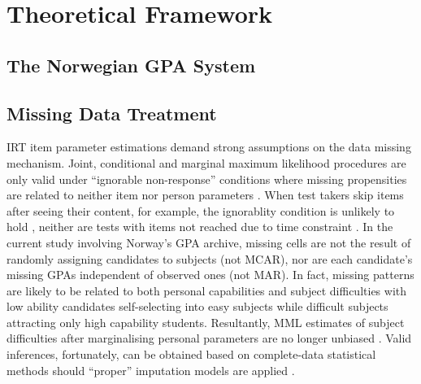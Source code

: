 \section{Theoretical Framework}

\subsection{The Norwegian GPA System}

\subsection{Missing Data Treatment}

IRT item parameter estimations demand strong assumptions on the data missing mechanism. Joint, conditional and marginal maximum likelihood procedures are only valid under ``ignorable non-response'' conditions where missing propensities are related to neither item nor person parameters \parencite{molenaar:1995}. When test takers skip items after seeing their content, for example, the ignorablity condition is unlikely to hold \parencite{mislevy:1987}, neither are tests with items not reached due to time constraint \parencite{lord:1974, lord:1983}. In the current study involving Norway's GPA archive, missing cells are not the result of randomly assigning candidates to subjects (not MCAR), nor are each candidate's missing GPAs independent of observed ones (not MAR). In fact, missing patterns are likely to be related to both personal capabilities and subject difficulties with low ability candidates self-selecting into easy subjects while difficult subjects attracting only high capability students. Resultantly, MML estimates of subject difficulties after marginalising personal parameters are no longer unbiased \parencite[][Table 2]{mislevy:1988}. Valid inferences, fortunately, can be obtained based on complete-data statistical methods should ``proper'' imputation models are applied \parencite[][Chapter 4]{rubin:1987}.